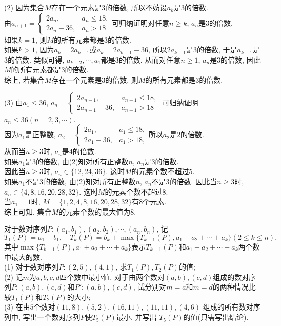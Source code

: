 \documentclass[green]{lsbook}
\begin{document}
(2) 因为集合$M$存在一个元素是$3$的倍数, 所以不妨设$a_k$是$3$的倍数.\\ 
由$a_{n+1}=\begin{cases}
	2a_n,& a_n\leq 18,\\
   2a_n-36,& a_n>18 
\end{cases}$可归纳证明对任意$n\geq k$, $a_n$是$3$的倍数.\\ 
如果$k=1$, 则$M$的所有元素都是$3$的倍数.\\ 
如果$k>1$, 因为$a_k=2a_{k-1}$或$a_k=2a_{k-1}-36$, 所以$2a_{k-1}$是$3$的倍数, 于是$a_{k-1}$是$3$的倍数. 类似可得, $a_{k-2},\cdots,a_1$都是$3$的倍数. 从而对任意$n\geq 1$, $a_n$是$3$的倍数, 因此$M$的所有元素都是$3$的倍数. \\
综上, 若集合$M$存在一个元素是$3$的倍数, 则$M$的所有元素都是$3$的倍数. 

(3) 由$a_1\leq 36$, $a_n=\begin{cases}
	2a_{n-1},& a_{n-1}\leq 18,\\
   2a_{n-1}-36,& a_{n-1}>18 
\end{cases}$
可归纳证明$a_n\leq 36(n=2, 3, \cdots)$.\\ 
因为$a_1$是正整数, $a_2 =\begin{cases}
	2a_1, & a_1\leq 18, \\
   2a_1-36, & a_1>18, 
\end{cases}$所以$a_2 $是$2$的倍数.\\ 
从而当$n\geq 3$时, $a_n$是$4$的倍数. \\
如果$a_1$是$3$的倍数, 由(2)知对所有正整数$n$, $a_n$是$3$的倍数.\\ 
因此当$n\geq 3$时, $a_n\in \{12, 24, 36\}$. 这时$M$的元素个数不超过$5$. \\
如果$a_1$不是$3$的倍数, 由(2)知对所有正整数$n$, $a_n$不是$3$的倍数. 
因此当$n\geq 3$时, $a_n\in \{4, 8, 16, 20, 28, 32\}$. 这时$M$的元素个数不超过$8$.\\ 
当$a_1=1$时, $M=\{1, 2, 4, 8, 16, 20, 28, 32\}$有$8$个元素. \\
综上可知, 集合$M$的元素个数的最大值为$8$. 
\newpage


\begin{tcolorbox}[applelight,title={2014.20(本小题13分)}]
对于数对序列$P\colon (a_1,b_1),(a_2,b_2),\cdots,(a_n,b_n)$, 记
\[T_1(P)=a_1+b_1,\quad T_k(P)=b_k+\max\{T_{k-1}(P),a_1+a_2+\cdots+a_k\}(2\leq k\leq n),\]
其中$\max\{T_{k-1}(P),a_1+a_2+\cdots+a_k\}$表示$T_{k-1}(P)$和$a_1+a_2+\cdots+a_k$两个数中最大的数.\\
 (1) 对于数对序列$P\colon (2,5),(4,1)$, 求$T_1(P), T_2(P)$的值;\\
 (2) 记$m$为$a, b, c, d$四个数中最小值, 对于由两个数对$(a, b), (c, d)$组成的数对序列$P\colon (a, b), (c, d)$和$P'\colon (a, b), (c, d)$, 试分别对$m=a$和$m=d$的两种情况比较$T_1(P)$和$T_2(P)$的大小;\\
 (3) 在由$5$个数对$(11,8),(5,2),(16,11),(11,11),(4,6)$ 组成的所有数对序列中, 写出一个数对序列$P$使$T_5(P)$最小, 并写出 $T_5(P)$的值(只需写出结论).
\end{tcolorbox}
\end{document}
